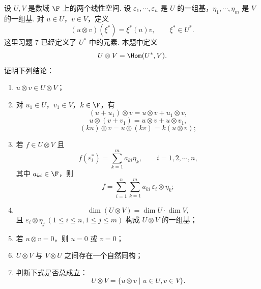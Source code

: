 \begin{problem}\label{习题18}
	\label{p1:concept:c7-l2632}设 $U,V$ 是数域 $\F$ 上的两个线性空间. 设 $\varepsilon_1,\cdots,\varepsilon_n$ 是 $U$ 的一组基，$\eta_1,\cdots,\eta_m$ 是 $V$ 的一组基. 对 $u\in U$，$v\in V$，定义
	\[
	(u\otimes v)(\xi^*)=\xi^*(u)v,
	\qquad \xi^*\in U^*.
	\]
	\label{p1:concept:c7-l2637}这里习题 7 已经定义了 $U^*$ 中的元素. 本题中定义
	\[
	U\otimes V=\Hom(U^*,V).
	\]
	证明下列结论：
	\begin{enumerate}
		\item $u\otimes v\in U\otimes V$；
		\item 对 $u_1\in U$，$v_1\in V$，$k\in\F$，有
		\[
		(u+u_1)\otimes v=u\otimes v+u_1\otimes v,
		\]
		\[
		u\otimes(v+v_1)=u\otimes v+u\otimes v_1,
		\]
		\[
		(ku)\otimes v=u\otimes(kv)=k(u\otimes v);
		\]
		\item 若 $f\in U\otimes V$ 且
		\[
		f(\varepsilon_i^*)=\sum_{k=1}^m a_{ki}\eta_k,
		\qquad i=1,2,\cdots,n,
		\]
		其中 $a_{ki}\in\F$，则
		\[
		f=\sum_{i=1}^n\sum_{k=1}^m a_{ki}\,\varepsilon_i\otimes\eta_k;
		\]
		\item 
		\[
		\dim(U\otimes V)=\dim U\cdot\dim V,
		\]
		且 $\varepsilon_i\otimes\eta_j\ (1\le i\le n,1\le j\le m)$ 构成 $U\otimes V$ 的一组基；
		\item 若 $u\otimes v=0$，则 $u=0$ 或 $v=0$；
		\item $U\otimes V$ 与 $V\otimes U$ 之间存在一个自然同构；
		\item 判断下式是否总成立：
		\[
		U\otimes V=\{u\otimes v\mid u\in U,
		v\in V\}.
		\]
	\end{enumerate}
\end{problem}

